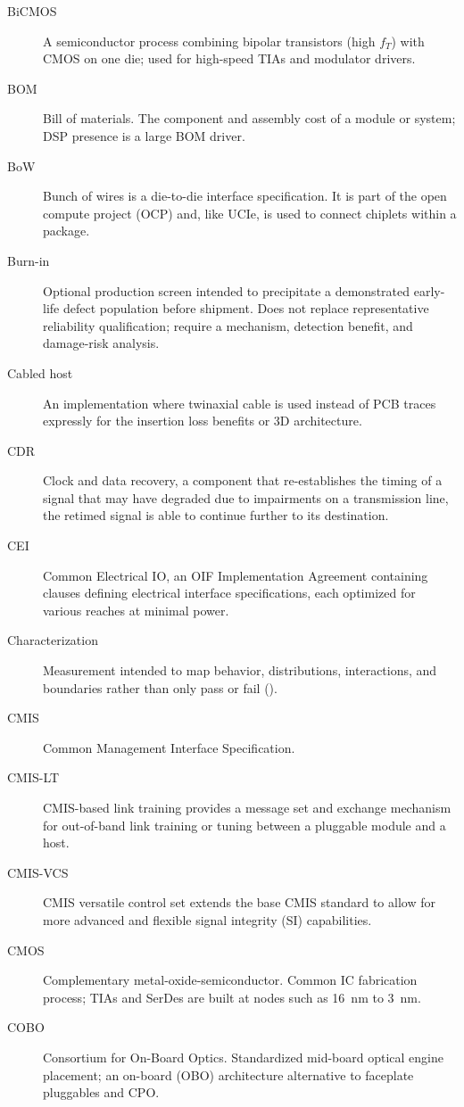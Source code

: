\begin{description}
\item[BiCMOS] A semiconductor process combining bipolar transistors (high $f_T$) with CMOS on one die; used for high-speed TIAs and modulator drivers.
\item[BOM] Bill of materials. The component and assembly cost of a module or system; DSP presence is a large BOM driver.
\item[BoW] Bunch of wires is a die-to-die interface specification. It is part of the open compute project (OCP) and, like UCIe, is used to connect chiplets within a package.
\item[Burn-in] Optional production screen intended to precipitate a demonstrated early-life defect population before shipment. Does not replace representative reliability qualification; require a mechanism, detection benefit, and damage-risk analysis.
\item[Cabled host] An implementation where twinaxial cable is used instead of PCB traces expressly for the insertion loss benefits or 3D architecture.
\item[CDR] Clock and data recovery, a component that re-establishes the timing of a signal that may have degraded due to impairments on a transmission line, the retimed signal is able to continue further to its destination.
\item[CEI] Common Electrical IO, an OIF Implementation Agreement containing clauses defining electrical interface specifications, each optimized for various reaches at minimal power.
\item[Characterization] Measurement intended to map behavior, distributions, interactions, and boundaries rather than only pass or fail ().
\item[CMIS] Common Management Interface Specification.
\item[CMIS-LT] CMIS-based link training provides a message set and exchange mechanism for out-of-band link training or tuning between a pluggable module and a host.
\item[CMIS-VCS] CMIS versatile control set extends the base CMIS standard to allow for more advanced and flexible signal integrity (SI) capabilities.
\item[CMOS] Complementary metal-oxide-semiconductor. Common IC fabrication process; TIAs and SerDes are built at nodes such as 16~nm to 3~nm.
\item[COBO] Consortium for On-Board Optics. Standardized mid-board optical engine placement; an on-board (OBO) architecture alternative to faceplate pluggables and CPO.

\end{description}
